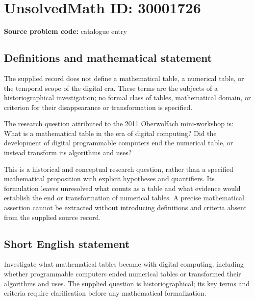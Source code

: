 \documentclass[11pt]{article}
\begin{document}
\section*{UnsolvedMath ID: 30001726}
\textbf{Source problem code:} catalogue entry
\subsection{Definitions and mathematical statement}
The supplied record does not define a mathematical table, a numerical table, or the temporal scope of the digital era. These terms are the subjects of a historiographical investigation; no formal class of tables, mathematical domain, or criterion for their disappearance or transformation is specified.

The research question attributed to the 2011 Oberwolfach mini-workshop is: What is a mathematical table in the era of digital computing? Did the development of digital programmable computers end the numerical table, or instead transform its algorithms and uses?

This is a historical and conceptual research question, rather than a specified mathematical proposition with explicit hypotheses and quantifiers. Its formulation leaves unresolved what counts as a table and what evidence would establish the end or transformation of numerical tables. A precise mathematical assertion cannot be extracted without introducing definitions and criteria absent from the supplied source record.
\subsection{Short English statement}
Investigate what mathematical tables became with digital computing, including whether programmable computers ended numerical tables or transformed their algorithms and uses. The supplied question is historiographical; its key terms and criteria require clarification before any mathematical formalization.
\end{document}
